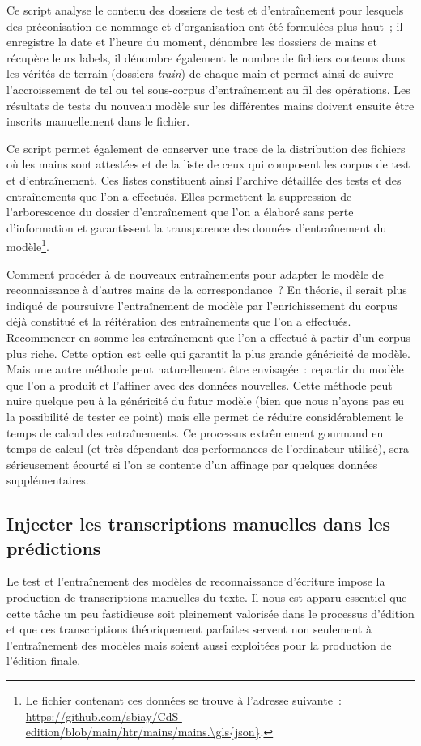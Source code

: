 \documentclass[a4paper,12pt,twoside]{book}
\begin{document}
				Ce script analyse le contenu des dossiers de test et d'entraînement pour lesquels des préconisation de nommage et d'organisation ont été formulées plus haut~; il enregistre la date et l'heure du moment, dénombre les dossiers de mains et récupère leurs labels, il dénombre également le nombre de fichiers contenus dans les vérités de terrain (dossiers \textit{train}) de chaque main et permet ainsi de suivre l'accroissement de tel ou tel sous-corpus d'entraînement au fil des opérations. Les résultats de tests du nouveau modèle sur les différentes mains doivent ensuite être inscrits manuellement dans le fichier.
				
				Ce script permet également de conserver une trace de la distribution des fichiers où les mains sont attestées et de la liste de ceux qui composent les corpus de test et d'entraînement. Ces listes constituent ainsi l'archive détaillée des tests et des entraînements que l'on a effectués. Elles permettent la suppression de l'arborescence du dossier d'entraînement que l'on a élaboré sans perte d'information et garantissent la transparence des données d'entraînement du modèle\footnote{Le fichier contenant ces données se trouve à l'adresse suivante~: \url{https://github.com/sbiay/CdS-edition/blob/main/htr/mains/mains.\gls{json}}.}.
				
				Comment procéder à de nouveaux entraînements pour adapter le modèle de reconnaissance à d'autres mains de la correspondance~? En théorie, il serait plus indiqué de poursuivre l'entraînement de modèle par l'enrichissement du corpus déjà constitué et la réitération des entraînements que l'on a effectués. Recommencer en somme les entraînement que l'on a effectué à partir d'un corpus plus riche. Cette option est celle qui garantit la plus grande généricité de modèle. Mais une autre méthode peut naturellement être envisagée~: repartir du modèle que l'on a produit et l'affiner avec des données nouvelles. Cette méthode peut nuire quelque peu à la généricité du futur modèle (bien que nous n'ayons pas eu la possibilité de tester ce point) mais elle permet de réduire considérablement le temps de calcul des entraînements. Ce processus extrêmement gourmand en temps de calcul (et très dépendant des performances de l'ordinateur utilisé), sera sérieusement écourté si l'on se contente d'un affinage par quelques données supplémentaires.
							
			\subsection{Injecter les transcriptions manuelles dans les \glspl{prédiction}}
				\label{injection}
				Le test et l'entraînement des modèles de reconnaissance d'écriture impose la production de transcriptions manuelles du texte. Il nous est apparu essentiel que cette tâche un peu fastidieuse soit pleinement valorisée dans le processus d'édition et que ces transcriptions théoriquement parfaites servent non seulement à l'entraînement des modèles mais soient aussi exploitées pour la production de l'édition finale.
				
\end{document}
